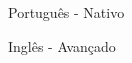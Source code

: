
\begin{cventries}
  \cventry
    {}
    {
      \begin{cvitems} %
        \item {Português - Nativo}
        \item {Inglês - Avançado}
      \end{cvitems}
    }
    {} {} {}

\end{cventries}